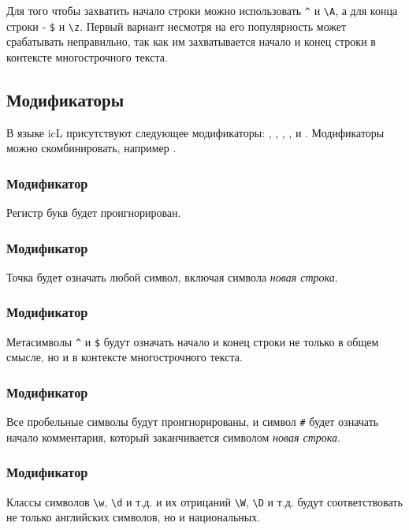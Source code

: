 \documentclass[a4paper, 14pt]{extarticle}
\begin{document}
Для того чтобы захватить начало строки можно использовать \lstinline|^| и \lstinline|\A|, а для конца строки - \lstinline|$| и \lstinline|\z|. Первый вариант несмотря на его популярность может срабатывать неправильно, так как им захватывается начало и конец строки в контексте многострочного текста.

\subsection{Модификаторы}

В языке icL присутствуют следующее модификаторы: , , , ,  и . Модификаторы можно скомбинировать, например .

\subsubsection{Модификатор }

Регистр букв будет проигнорирован. 

\subsubsection{Модификатор }

Точка будет означать любой символ, включая символа {\it новая строка}.

\subsubsection{Модификатор }

Метасимволы \lstinline|^| и \lstinline|$| будут означать начало и конец строки не только в общем смысле, но и в контексте многострочного текста.

\subsubsection{Модификатор }

Все пробельные символы будут проигнорированы, и символ \lstinline|#| будет означать начало комментария, который заканчивается символом {\it новая строка}.

\subsubsection{Модификатор }

Классы символов \lstinline|\w|, \lstinline|\d| и т.д. и их отрицаний \lstinline|\W|, \lstinline|\D| и т.д. будут соответствовать не только английских символов, но и национальных.
\end{document}
